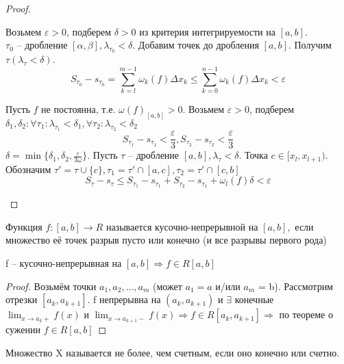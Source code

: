 \begin{proof}
	\begin{MyList}
		\item Возьмем $\varepsilon > 0$, подберем $\delta > 0$ из критерия интегрируемости на $[a, b]$. \\
		$\tau_0$ -- дробление $[\alpha, \beta], \lambda_{\tau_0} < \delta$. Добавим точек до дробления $[a, b]$. Получим $\tau (\lambda_\tau < \delta)$.
		\[S_{\tau_0} - s_{\tau_0} = \sum_{k = l}^{m - 1} \omega_k (f) \Delta x_k \leqslant \sum_{k = 0}^{n - 1} \omega_k (f) \Delta x_k < \varepsilon\]

		\item Пусть $f$ не постоянна, т.е. $\omega(f)_{[a, b]} > 0$.
		Возьмем $\varepsilon > 0$, подберем $\delta_1, \delta_2 : \forall \tau_1 : \lambda_{\tau_1} < \delta_1, \forall \tau_2 : \lambda_{\tau_2} < \delta_2$
		\[S_{\tau_1} - s_{\tau_1} < \frac{\varepsilon}{3}, S_{\tau_2} - s_{\tau_2} < \frac{\varepsilon}{3}\]
		$\delta = \min \{\delta_1, \delta_2, \frac{\varepsilon}{3 \omega}\}$. Пусть $\tau$ -- дробление $[a, b], \lambda_\tau < \delta$.
		Точка $c \in [x_l, x_{l + 1})$. Обозначим $\tau' = \tau \cup \{c\}, \tau_1 = \tau' \cap [a, c], \tau_2 = \tau' \cap [c, b]$
		\[S_\tau - s_\tau \leqslant S_{\tau_1} - s_{\tau_1} + S_{\tau_2} - s_{\tau_1} + \omega_l (f) \delta < \varepsilon\]   
	\end{MyList}
\end{proof}

\gdef\AuthorName{Ксения Кузьмина}

\begin{Def}
	Функция $f:[a,b] \to R$ называется кусочно-непрерывной на $[a,b],$ если множество её точек разрыв пусто или конечно (и все разрывы первого рода)
\end{Def}

\begin{Cons}
	f -- кусочно-непрерывная на $[a, b] \Rightarrow f \in R[a,b]$
\end{Cons}

\begin{proof}
	Возьмём точки $a_1, a_2, ..., a_m$ (может $a_1 = a$ и/или $a_m$ = b). Рассмотрим отрезки $[a_k, a_{k+1}]$. f непрерывна на $(a_k, a_{k+1})$  и $\exists$ 
	конечные $\displaystyle \lim_{x \to a_k+} f(x)$ и $\displaystyle \lim_{x \to a_{k+1}-} f(x) \Rightarrow f \in R[a_k, a_{k+1}] \Rightarrow$  по теореме о сужении $f \in R[a,b]$
\end{proof}

\begin{Def} 
	Множество X называется не более, чем счетным, если оно конечно или счетно. 
\end{Def} 

